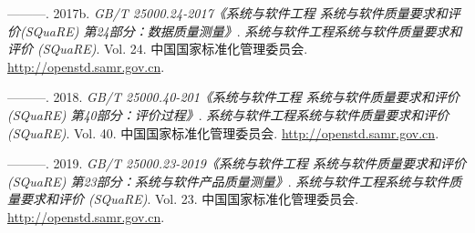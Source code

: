 \documentclass[hyperref, a4paper]{ctexart}
\begin{document}
\leavevmode\hypertarget{ref-innovative4}{}%
---------. 2017b. \emph{GB/T 25000.24-2017《系统与软件工程
系统与软件质量要求和评价(SQuaRE) 第24部分：数据质量测量》}.
\emph{系统与软件工程系统与软件质量要求和评价 (SQuaRE)}. Vol. 24.
中国国家标准化管理委员会. \url{http://openstd.samr.gov.cn}.

\leavevmode\hypertarget{ref-innovative5}{}%
---------. 2018. \emph{GB/T 25000.40-201《系统与软件工程
系统与软件质量要求和评价(SQuaRE) 第40部分：评价过程》}.
\emph{系统与软件工程系统与软件质量要求和评价 (SQuaRE)}. Vol. 40.
中国国家标准化管理委员会. \url{http://openstd.samr.gov.cn}.

\leavevmode\hypertarget{ref-innovative2}{}%
---------. 2019. \emph{GB/T 25000.23-2019《系统与软件工程
系统与软件质量要求和评价(SQuaRE) 第23部分：系统与软件产品质量测量》}.
\emph{系统与软件工程系统与软件质量要求和评价 (SQuaRE)}. Vol. 23.
中国国家标准化管理委员会. \url{http://openstd.samr.gov.cn}.
\end{document}
